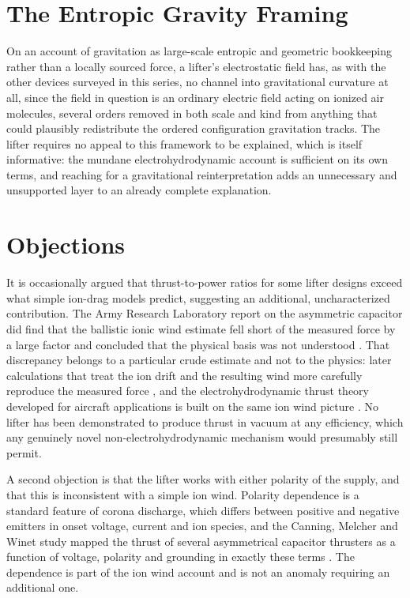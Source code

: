\documentclass[11pt]{article}
\begin{document}
\section{The Entropic Gravity Framing}

On an account of gravitation as large-scale entropic and geometric bookkeeping rather than a locally sourced force, a lifter's electrostatic field has, as with the other devices surveyed in this series, no channel into gravitational curvature at all, since the field in question is an ordinary electric field acting on ionized air molecules, several orders removed in both scale and kind from anything that could plausibly redistribute the ordered configuration gravitation tracks. The lifter requires no appeal to this framework to be explained, which is itself informative: the mundane electrohydrodynamic account is sufficient on its own terms, and reaching for a gravitational reinterpretation adds an unnecessary and unsupported layer to an already complete explanation.

\section{Objections}

It is occasionally argued that thrust-to-power ratios for some lifter designs exceed what simple ion-drag models predict, suggesting an additional, uncharacterized contribution. The Army Research Laboratory report on the asymmetric capacitor did find that the ballistic ionic wind estimate fell short of the measured force by a large factor and concluded that the physical basis was not understood \cite{BF2003}. That discrepancy belongs to a particular crude estimate and not to the physics: later calculations that treat the ion drift and the resulting wind more carefully reproduce the measured force \cite{ISM2011}, and the electrohydrodynamic thrust theory developed for aircraft applications is built on the same ion wind picture \cite{MPP2017}. No lifter has been demonstrated to produce thrust in vacuum at any efficiency, which any genuinely novel non-electrohydrodynamic mechanism would presumably still permit.

A second objection is that the lifter works with either polarity of the supply, and that this is inconsistent with a simple ion wind. Polarity dependence is a standard feature of corona discharge, which differs between positive and negative emitters in onset voltage, current and ion species, and the Canning, Melcher and Winet study mapped the thrust of several asymmetrical capacitor thrusters as a function of voltage, polarity and grounding in exactly these terms \cite{CMW2004}. The dependence is part of the ion wind account and is not an anomaly requiring an additional one.
\end{document}
